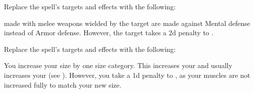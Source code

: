 Replace the spell's targets and effects with the following:
\begin{spellcontent}

\begin{augmenttargetinginfo}



\end{augmenttargetinginfo}


\begin{augmenteffects}



\spelleffect
{} made with melee weapons wielded by the target are made against Mental defense instead of Armor defense.
However, the target takes a \minus2d penalty to .








\end{augmenteffects}

\end{spellcontent}








Replace the spell's targets and effects with the following:
\begin{spellcontent}

\begin{augmenttargetinginfo}



\end{augmenttargetinginfo}


\begin{augmenteffects}



\spelleffect
You increase your size by one size category.
This increases your  and usually increases your  (see ).
However, you take a \minus1d penalty to , as your muscles are not increased fully to match your new size.








\end{augmenteffects}

\end{spellcontent}





